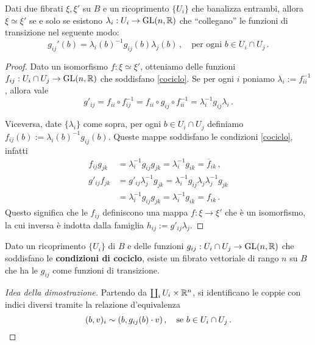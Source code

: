 \begin{thm}
	Dati due fibrati $\xi, \xi'$ su $B$ e un ricoprimento $\{U_{i}\}$ che banalizza entrambi,
	allora $\xi \simeq \xi'$ se e solo se esistono $\lambda_{i}:U_{i} \to \mathrm{GL}(n,{\mathbb R})$
	che ``collegano'' le funzioni di transizione nel seguente modo:
	\begin{equation*}
		g_{ij}'(b) = \lambda_{i}(b) ^{-1} g_{ij}(b) \lambda_{j}(b)\,,
		\quad \text{per ogni } b \in U_{i} \cap U_{j}\,.
	\end{equation*}
	\begin{proof}
		Dato un isomorfismo $f:\xi \simeq \xi'$, 
		otteniamo delle funzioni $f_{ij}:U_{i} \cap U_{j} \to \mathrm{GL}(n,{\mathbb R})$
		che soddisfano \eqref{cociclo}. 
		Se per ogni $i$ poniamo $\lambda_{i} := f_{ii}^{-1}$,
		allora vale
		\begin{equation*}
			g'_{ij} = f_{ii} \circ f_{ij}^{-1}
			= f_{ii} \circ g_{ij} \circ f_{ii}^{-1}
			= \lambda_{i}^{-1} g_{ij} \lambda_{i}\,.
		\end{equation*}
		
		Viceversa, date $\{\lambda_{i}\}$ come sopra, per ogni $b \in U_{i} \cap U_{j}$
		definiamo $f_{ij}(b) := \lambda_{i}(b)^{-1} g_{ij}(b)$.
		Queste mappe soddisfano le condizioni \eqref{cociclo}, infatti
		\begin{align*}
			f_{ij} g_{jk} &= \lambda_{i}^{-1} g_{ij} g_{jk} 
			= \lambda_{i}^{-1}g_{ik} =  \overline{f}_{ik}\,, \\
			g'_{ij} f_{jk} &= g'_{ij} \lambda_{j}^{-1} g_{jk} 
			= \lambda_{i}^{-1} g_{ij} \lambda_{j} \lambda_{j}^{-1} g_{jk} \\
			&= \lambda_{i}^{-1} g_{ij} g_{jk} = \lambda_{i}^{-1} g_{ik} = f_{ik}\,.
		\end{align*}
		Questo significa che le $f_{ij}$ definiscono una mappa $f:\xi \to \xi'$
		che è un isomorfismo, la cui inversa è indotta dalla famiglia $h_{ij} := g'_{ij} \lambda_{j}$.
	\end{proof}
\end{thm}

\begin{thm}
	Dato un ricoprimento $\{U_{i}\}$ di $B$ e delle funzioni 
	$g_{ij}:U_{i} \cap U_{j} \to \mathrm{GL}(n,{\mathbb R})$ che soddisfano le \textbf{condizioni di cociclo},
	esiste un fibrato vettoriale di rango $n$ su $B$ che ha le $g_{ij}$ come
	funzioni di transizione.
	\begin{proof}[Idea della dimostrazione]
		Partendo da $\coprod_{i} U_{i} \times {\mathbb R}^{n}$,
		si identificano le coppie con indici diversi 
		tramite la relazione d'equivalenza
		\begin{equation*}
			(b,v)_{i} \sim (b, g_{ij}(b) \cdot v)\,, \quad
			\text{se } b \in U_{i} \cap U_{j}\,. \qedhere
		\end{equation*}
	\end{proof}
\end{thm}

